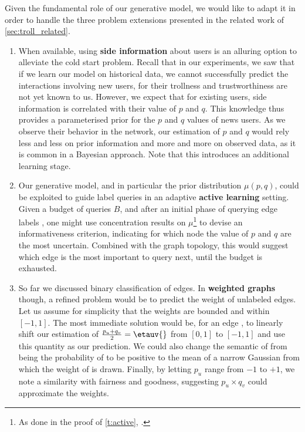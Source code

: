 \bigskip

Given the fundamental role of our generative model, we would like to adapt it in order to handle
the three problem extensions presented in the related work of \autoref{sec:troll_related}.

\begin{enumerate}[1.,]

  \item When available, using \textbf{side information} about users is an alluring option to
    alleviate the cold start problem. Recall that in our experiments, we saw that if we learn our
    model on historical data, we cannot successfully predict the interactions involving new users,
    for their trollness and trustworthiness are not yet known to us. However, we expect that for
    existing users, side information is correlated with their value of $p$ and $q$. This knowledge
    thus provides a parameterised prior for the $p$ and $q$ values of news users. As we observe
    their behavior in the network, our estimation of $p$ and $q$ would rely less and less on prior
    information and more and more on observed data, as it is common in a Bayesian approach. Note
    that this introduces an additional learning stage.

  \item Our generative model, and in particular the prior distribution $\mu(p,q)$, could be
    exploited to guide label queries in an adaptive \textbf{active learning} setting. Given a budget
    of queries $B$, and after an initial phase of querying edge labels \uar{}, one might use
    concentration results on $\mu$\footnote{As done in the proof of \autoref{t:active},
    .} to devise an informativeness criterion, indicating for which
    node the value of $p$ and $q$ are the most uncertain. Combined with the graph topology, this
    would suggest which edge is the most important to query next, until the budget is exhausted.

  \item So far we discussed binary classification of edges. In \textbf{weighted graphs} though, a
    refined problem would be to predict the weight of unlabeled edges. Let us assume for simplicity
    that the weights are bounded and within $[-1, 1]$. The most immediate solution would be, for an
    edge \euv{}, to linearly shift our estimation of $\frac{p_u+q_v}{2}=\etauv{}$ from $[0,1]$ to
    $[-1,1]$ and use this quantity as our prediction. We could also change the semantic of \etauv{}
    from being the probability of \euv{} to be positive to the mean of a narrow Gaussian from which
    the weight of \euv{} is drawn. Finally, by letting $p_u$ range from $-1$ to $+1$, we note a
    similarity with fairness and goodness, suggesting $p_u\times q_v$ could approximate the weights.
\end{enumerate}
